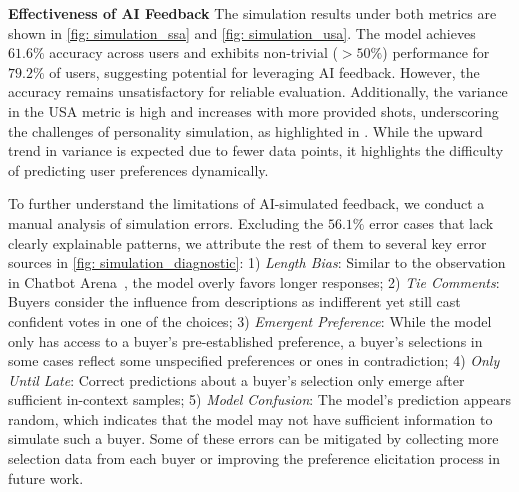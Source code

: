 \textbf{Effectiveness of AI Feedback}\quad
The simulation results under both metrics are shown in \cref{fig: simulation_ssa} and \ref{fig: simulation_usa}. The model achieves $61.6\%$ accuracy across users and exhibits non-trivial ($>50\%$) performance for $79.2\%$ of users, suggesting potential for leveraging AI feedback. However, the accuracy remains unsatisfactory for reliable evaluation. Additionally, the variance in the USA metric is high and increases with more provided shots, underscoring the challenges of personality simulation, as highlighted in \citep{wang2024learning}. While the upward trend in variance is expected due to fewer data points, it highlights the difficulty of predicting user preferences dynamically.

To further understand the limitations of AI-simulated feedback, we conduct a manual analysis of simulation errors. Excluding the $56.1\%$ error cases that lack clearly explainable patterns, we attribute the rest of them to several key error sources in \cref{fig: simulation_diagnostic}:
1) \textit{Length Bias}: Similar to the observation in Chatbot Arena~\citep{zheng2023judging}, the model overly favors longer responses; 
2) \textit{Tie Comments}: Buyers consider the influence from descriptions as indifferent yet still cast confident votes in one of the choices; 
3) \textit{Emergent Preference}: While the model only has access to a buyer's pre-established preference, a buyer's selections in some cases reflect some unspecified preferences or ones in contradiction;
4) \textit{Only Until Late}: Correct predictions about a buyer's selection only emerge after sufficient in-context samples; 
5) \textit{Model Confusion}:
The model's prediction appears random, which indicates that the model may not have sufficient information to simulate such a buyer.
Some of these errors can be mitigated by collecting more selection data from each buyer or improving the preference elicitation process in future work.

